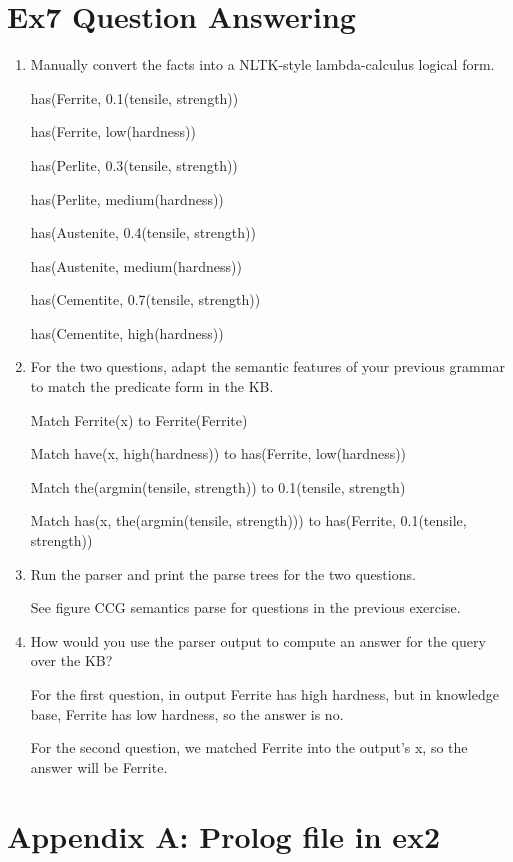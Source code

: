 \documentclass[12pt]{article}
\begin{document}
{\newpage
\section{Ex7 Question Answering}
\label{sec: ex7}
\begin{enumerate}[1.]
    \item Manually convert the facts into a NLTK-style lambda-calculus logical form.
    
    has(Ferrite, 0.1(tensile, strength))

    has(Ferrite, low(hardness))

    has(Perlite, 0.3(tensile, strength))

    has(Perlite, medium(hardness))

    has(Austenite, 0.4(tensile, strength))

    has(Austenite, medium(hardness))

    has(Cementite, 0.7(tensile, strength))

    has(Cementite, high(hardness))
    \item For the two questions, adapt the semantic features of your previous grammar to match the predicate form in the KB.
    
    Match Ferrite(x) to Ferrite(Ferrite)

    Match have(x, high(hardness)) to has(Ferrite, low(hardness))
    
    Match the(argmin(tensile, strength)) to 0.1(tensile, strength)
    
    Match has(x, the(argmin(tensile, strength))) to has(Ferrite, 0.1(tensile, strength))
    \item Run the parser and print the parse trees for the two questions.
    
    See figure CCG semantics parse for questions in the previous exercise.
    \item How would you use the parser output to compute an answer for the query over the KB?
    
    For the first question, in output Ferrite has high hardness, but in knowledge base, Ferrite has low hardness,
    so the answer is no.

    For the second question, we matched Ferrite into the output's x, so the answer will be Ferrite.
\end{enumerate}

\newpage
\section{Appendix A: Prolog file in ex2}
\label{sec: AppendixA}


}
\end{document}
